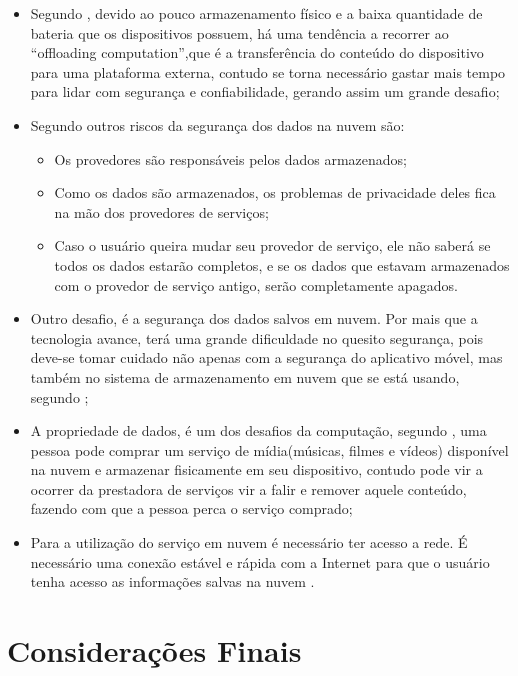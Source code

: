 \documentclass[12pt]{article}
\begin{document}
\begin{itemize}
 \item Segundo \cite{kumar2014}, devido ao pouco armazenamento físico e a baixa quantidade de bateria que os dispositivos
 possuem, há uma tendência a recorrer ao “offloading computation”,que é a transferência do conteúdo do dispositivo para uma
 plataforma externa, contudo se torna necessário gastar mais tempo para lidar com segurança e confiabilidade, gerando assim um
 grande desafio;

  \item Segundo \cite{gao13} outros riscos da segurança dos dados na nuvem são:

    \begin{itemize}
      \item Os provedores são responsáveis pelos dados armazenados;
      \item Como os dados são armazenados, os problemas de privacidade deles fica na mão dos provedores de serviços;
      \item Caso o usuário queira mudar seu provedor de serviço, ele não saberá se todos os dados estarão completos, e se os
      dados que estavam armazenados com o provedor de serviço antigo, serão completamente apagados.
    \end{itemize}

 \item Outro desafio, é a segurança dos dados salvos em nuvem. Por mais que a tecnologia avance, terá uma grande dificuldade no
 quesito segurança, pois deve-se tomar cuidado não apenas com a segurança do aplicativo móvel, mas também no sistema de
 armazenamento em nuvem que se está usando, segundo \cite{kumar2014};

 \item A propriedade de dados, é um dos desafios da computação, segundo \cite{alizadeh2013}, uma pessoa pode comprar um serviço
 de mídia(músicas, filmes e vídeos) disponível na nuvem e armazenar fisicamente em seu dispositivo, contudo pode vir a ocorrer da
 prestadora de serviços vir a falir e remover aquele conteúdo, fazendo com que a pessoa perca o serviço comprado;

 \item Para a utilização do serviço em nuvem é necessário ter acesso a rede. É necessário uma conexão estável e rápida com a
 Internet para que o usuário tenha acesso as informações salvas na nuvem \cite{alizadeh2013}.

\end{itemize}


\section{Considerações Finais}



\end{document}
